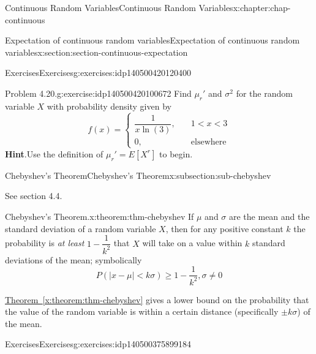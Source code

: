 \documentclass[oneside,10pt,]{book}
\newcommand{\blocktitlefont}{\relax}
\newcommand{\xreffont}{\relax}
\newcommand{\lt}{<}
\newcommand{\amp}{&}
\begin{document}
\begin{chapterptx}{Continuous Random Variables}{}{Continuous Random Variables}{}{}{x:chapter:chap-continuous}
\begin{sectionptx}{Expectation of continuous random variables}{}{Expectation of continuous random variables}{}{}{x:section:section-continuous-expectation}
\typeout{************************************************}
%
\begin{exercises-subsection}{Exercises}{}{Exercises}{}{}{g:exercises:idp140500420120400}
\begin{divisionexercise}{1}{Problem 4.20.}{}{g:exercise:idp140500420100672}%
Find \(\mu_r'\) and \(\sigma^2\) for the random variable \(X\) with probability density given by%
\begin{equation*}
f(x) = \begin{cases}
\dfrac{1}{x\ln(3)}, \amp \quad 1 \lt x \lt 3\\
0, \amp \quad \text{elsewhere}\end{cases}
\end{equation*}
%
\textbf{\blocktitlefont Hint}.\quad{}Use the definition of \(\mu_r' = E[X^r]\) to begin.\end{divisionexercise}%
\end{exercises-subsection}
%
%
\typeout{************************************************}
\typeout{************************************************}
%
\begin{subsectionptx}{Chebyshev's Theorem}{}{Chebyshev's Theorem}{}{}{x:subsection:sub-chebyshev}
\begin{introduction}{}%
See section 4.4.%
\end{introduction}%
\begin{theorem}{Chebyshev's Theorem.}{}{x:theorem:thm-chebyshev}%
If \(\mu\) and \(\sigma\) are the mean and the standard deviation of a random variable \(X\), then for any positive constant \(k\) the probability is \emph{at least} \(1-\dfrac{1}{k^2}\) that \(X\) will take on a value within \(k\) standard deviations of the mean; symbolically%
\begin{equation*}
P(|x-\mu| \lt k\sigma) \ge 1 -
\dfrac{1}{k^2}, \sigma \ne 0
\end{equation*}
%
\end{theorem}
\hyperref[x:theorem:thm-chebyshev]{Theorem~{\xreffont\ref{x:theorem:thm-chebyshev}}} gives a lower bound on the probability that the value of the random variable is within a certain distance (specifically \(\pm k\sigma\)) of the mean.%
\end{subsectionptx}
%
%
\typeout{************************************************}
\typeout{************************************************}
%
\begin{exercises-subsection}{Exercises}{}{Exercises}{}{}{g:exercises:idp140500375899184}

\end{exercises-subsection}
\end{sectionptx}
\end{chapterptx}
\end{document}
